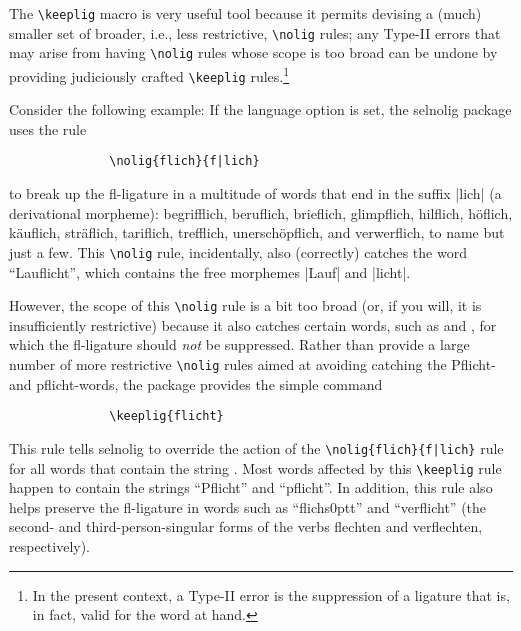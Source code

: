 \documentclass[11pt]{article}
\newcommand{\pkg}[1]{\textsf{#1}}
\newcommand{\opt}[1]{\uselig{\texttt{#1}}}
\newcommand{\cmmd}[1]{\texttt{\textbackslash #1}}
\begin{document}
The \cmmd{keeplig} macro is very useful tool because it permits devising a (much) smaller set of broader, i.e., less restrictive, \cmmd{nolig} rules; any Type-II errors that may arise from having \cmmd{nolig} rules whose scope is too broad can be undone by providing judiciously crafted \cmmd{keeplig} rules.\footnote{In the present context, a Type-II error is the suppression of a ligature that is, in fact, valid for the word at hand. }

Consider the following example: If the \opt{ngerman} language option is set, the \pkg{selnolig} package uses the rule 
\begin{Verbatim}
              \nolig{flich}{f|lich}
\end{Verbatim}
to break up the fl-ligature in a multitude of words that end in the suffix |lich| (a derivational morpheme): begrifflich, beruflich, brieflich, glimpflich, hilflich, höflich, käuflich, s\breaklig träflich, tariflich, trefflich, unerschöpflich, and verwerflich, to name but just a few. This \cmmd{nolig} rule, incidentally, also (correctly) catches the word \enquote{Lauflicht}, which contains the free morphemes |Lauf| and |licht|.

However, the scope of this \cmmd{nolig} rule is a bit too broad (or, if you will, it is insufficiently restrictive) because it also catches certain words, such as \opt{Pflicht} and \opt{verpflichten}, for which the fl-ligature should \emph{not} be suppressed. Rather than provide a large number of more restrictive \cmmd{nolig} rules aimed at avoiding catching the Pflicht- and pflicht-words, the package provides the simple command
\begin{Verbatim}
              \keeplig{flicht}
\end{Verbatim}
This rule tells \pkg{selnolig} to override the action of the \Verb+\nolig{flich}{f|lich}+ rule for all words that contain the string \opt{flicht}. Most words affected by this \cmmd{keeplig} rule happen to contain the strings \enquote{Pflicht} and \enquote{pflicht}. In addition, this rule also helps preserve the fl-ligature in words such as \enquote{flichs\kern0ptt} and \enquote{verflicht} (the second- and third-person-singular forms of the verbs flechten and verflechten, respectively).
\end{document}
